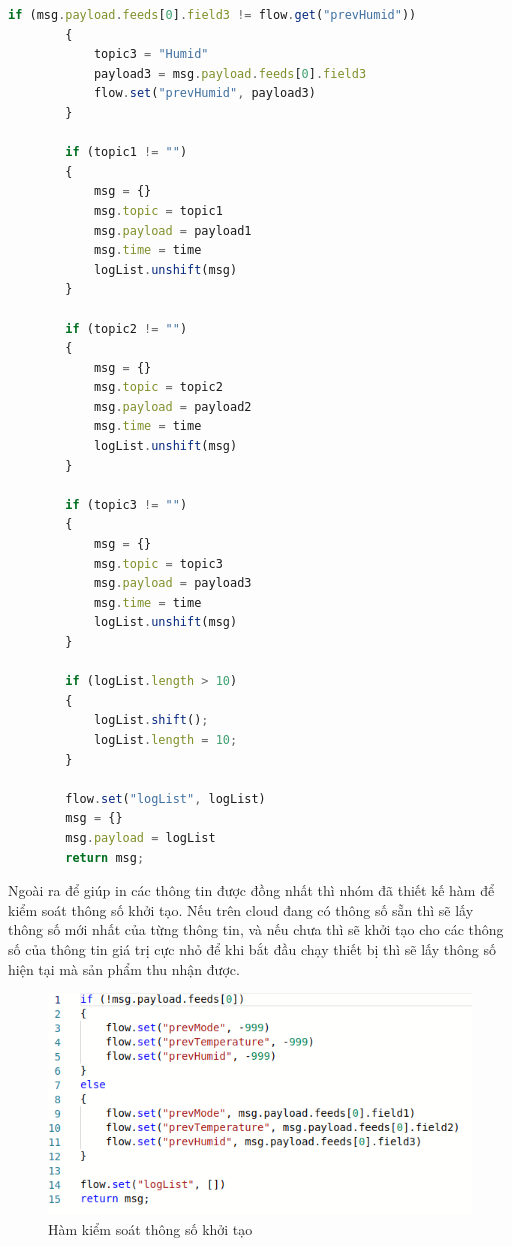 \documentclass{report}
\begin{document}
\begin{enumerate}
\begin{lstlisting}[language=JavaScript, caption={function of control log list}]
        if (msg.payload.feeds[0].field3 != flow.get("prevHumid")) 
        {
            topic3 = "Humid"
            payload3 = msg.payload.feeds[0].field3
            flow.set("prevHumid", payload3)
        }

        if (topic1 != "")
        {
            msg = {}
            msg.topic = topic1
            msg.payload = payload1
            msg.time = time
            logList.unshift(msg)
        }

        if (topic2 != "") 
        {
            msg = {}
            msg.topic = topic2
            msg.payload = payload2
            msg.time = time
            logList.unshift(msg)
        }

        if (topic3 != "") 
        {
            msg = {}
            msg.topic = topic3
            msg.payload = payload3
            msg.time = time
            logList.unshift(msg)
        }

        if (logList.length > 10) 
        {
            logList.shift();
            logList.length = 10;
        }

        flow.set("logList", logList)
        msg = {}
        msg.payload = logList
        return msg;
    \end{lstlisting}

    Ngoài ra để  giúp in các thông tin được đồng nhất thì nhóm đã thiết kế  hàm để kiểm soát thông số  khởi tạo. Nếu trên cloud đang có thông số sẵn thì sẽ lấy thông số mới nhất của từng thông tin, và nếu chưa thì sẽ khởi tạo cho các thông số của thông tin giá trị cực nhỏ để khi bắt đầu chạy thiết bị thì sẽ lấy thông số  hiện tại mà sản phẩm thu nhận được.
    \begin{figure}[H]
        \includegraphics[width=\textwidth, keepaspectratio]{img/flow/init_log_value.png}
        \centering
        \caption{Hàm kiểm soát thông số khởi tạo}
    \end{figure}
\end{enumerate}
\end{document}
